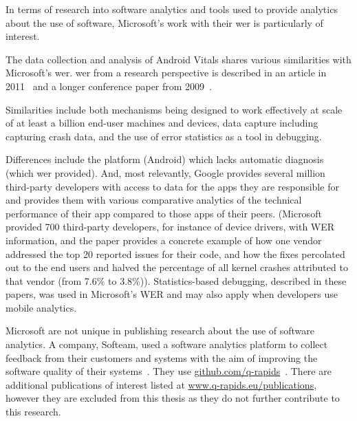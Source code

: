 In terms of research into software analytics and tools used to provide analytics about the use of software, Microsoft's work with their \Gls{wer} is particularly of interest. 

The data collection and analysis of Android Vitals shares various similarities with Microsoft's \acrfull{wer}. \Gls{wer} from a research perspective is described in an article in 2011~ and a longer conference paper from 2009~. 

Similarities include both mechanisms being designed to work effectively at scale of at least a billion end-user machines and devices, data capture including capturing crash data, and the use of error statistics as a tool in debugging.

Differences include the platform (Android) which lacks automatic diagnosis (which \Gls{wer} provided). And, most relevantly, Google provides several million third-party developers with access to data for the apps they are responsible for and provides them with various comparative analytics of the technical performance of their app compared to those apps of their peers. (Microsoft provided 700 third-party developers, for instance of device drivers, with WER information, and the paper provides a concrete example of how one vendor addressed the top 20 reported issues for their code, and how the fixes percolated out to the end users and halved the percentage of all kernel crashes attributed to that vendor (from 7.6\% to 3.8\%)). Statistics-based debugging, described in these papers, was used in Microsoft's WER and may also apply when developers use mobile analytics.

Microsoft are not unique in publishing research about the use of software analytics. A company, Softeam, used a software analytics platform to collect feedback from their customers and systems with the aim of improving the software quality of their systems~. They use \href{https://github.com/q-rapids}{github.com/q-rapids}~. There are additional publications of interest listed at \href{https://www.q-rapids.eu/publications}{www.q-rapids.eu/publications}, however they are excluded from this thesis as they do not further contribute to this research.


